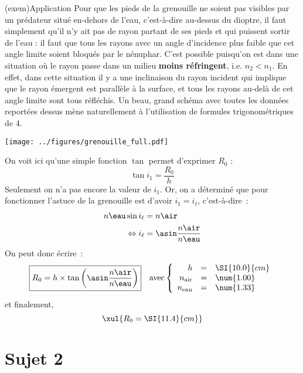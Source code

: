 \documentclass[a4paper, 10pt]{book}
\begin{document}
{	\begin{tcb}[breakable](exem){Application}
		Pour que les pieds de la grenouille ne soient pas visibles par un prédateur
		situé en-dehors de l'eau, c'est-à-dire au-dessus du dioptre, il faut
		simplement qu'il n'y ait pas de rayon partant de ses pieds et qui puissent
		sortir de l'eau : il faut que tous les rayons avec un angle d'incidence plus
		faible que cet angle limite soient bloqués par le nénuphar. C'est possible
		puisqu'on est dans une situation où le rayon passe dans un milieu
		\textbf{moins réfringent}, i.e. $n_2 < n_1$. En effet, dans cette situation
		il y a une inclinaison du rayon incident qui implique que le rayon émergent
		est parallèle à la surface, et tous les rayons au-delà de cet angle limite
		sont tous réfléchis. Un beau, grand schéma avec toutes les données reportées
		dessus mène naturellement à l'utilisation de formules trigonométriques de
		4\ieme.
		\begin{center}
			\vspace*{-2.5cm}
			\texttt{[image: ../figures/grenouille\_full.pdf]}
		\end{center}
		On voit ici qu'une simple fonction $\tan$ permet d'exprimer $R_0$ :
		\[
			\boxed{\tan i_1 = \frac{R_0}{h}}
		\]
		Seulement on n'a pas encore la valeur de $i_1$. Or, on a déterminé que pour
		fonctionner l'astuce de la grenouille est d'avoir $i_1 = i_\ell$,
		c'est-à-dire~:
		\begin{align}
			n\eau\sin i_\ell       & = n\air                                    \\
			\Leftrightarrow i_\ell & = \asin \frac{n\air}{n\eau}\label{eq:ilim}
		\end{align}
		On peut donc écrire~:
		\[
			\boxed{
				R_0 = h\times\tan\left(\asin \frac{n\air}{n\eau}\right)
			}
			\quad \text{avec}
			\left\{
			\begin{array}{rcl}
				h              & = & \SI{10.0}{cm} \\
				n_\mathrm{air} & = & \num{1.00}    \\
				n_\mathrm{eau} & = & \num{1.33}
			\end{array}
			\right.
		\]
		et finalement,
		\[
			\xul{R_0 = \SI{11.4}{cm}}
		\]
	\end{tcb}
}

\newpage

\chapter{Sujet 2}
\end{document}
